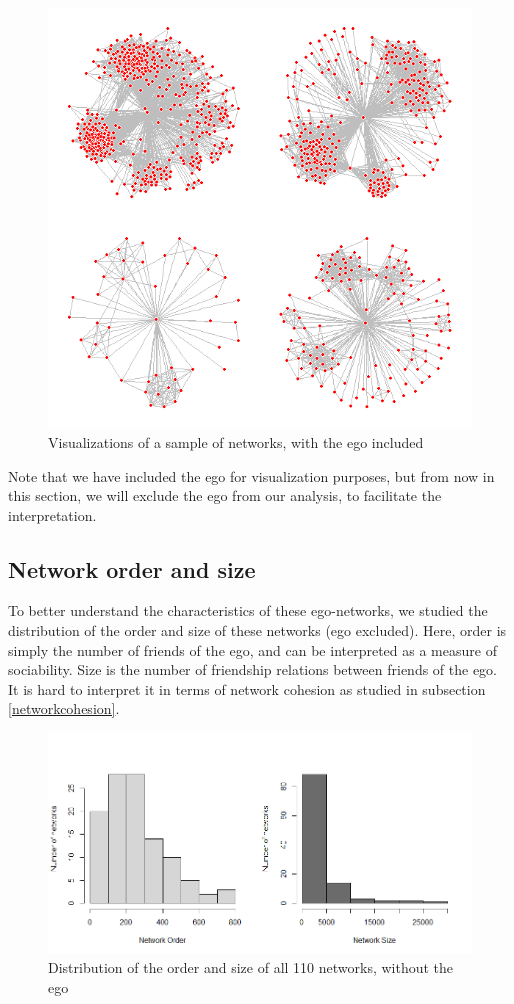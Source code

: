 \documentclass[11pt]{article}       %
\begin{document}
\begin{figure}[H]
\centering
  \includegraphics[width=0.7\linewidth]{viz4graph.png}
    \caption{Visualizations of a sample of networks, with the ego included}
\end{figure}

Note that we have included the ego for visualization purposes, but from now in this section, we will exclude the ego from our analysis, to facilitate the interpretation.

\subsection{Network order and size} \label{ordersize}

To better understand the characteristics of these ego-networks, we studied the distribution of the order and size of these networks (ego excluded). Here, order is simply the number of friends of the ego, and can be interpreted as a measure of sociability. Size is the number of friendship relations between friends of the ego. It is hard to interpret it in terms of network cohesion as studied in subsection \ref{networkcohesion}.

\begin{figure}[H]
\centering
  \includegraphics[width=\linewidth]{SizeOrderDistribution.png}
    \caption{Distribution of the order and size of all 110 networks, without the ego}
\end{figure}
\end{document}
